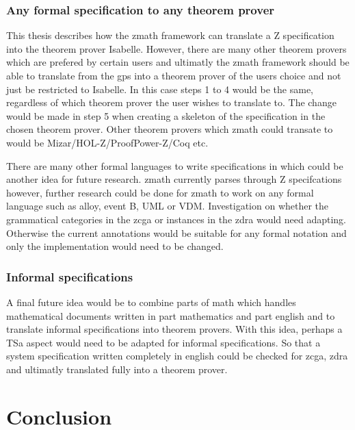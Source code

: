 \subsubsection{Any formal specification to any theorem prover}
\label{subsubsec:anyformanythe}

This thesis describes how the \gls{zmath} framework can translate a Z specification into the theorem prover Isabelle. However, there are many other theorem provers which are prefered by certain users and ultimatly the \gls{zmath} framework should be able to translate from the \gls{gps} into a theorem prover of the users choice and not just be restricted to Isabelle. In this case steps 1 to 4 would be the same, regardless of which theorem prover the user wishes to translate to. The change would be made in step 5 when creating a skeleton of the specification in the chosen theorem prover. Other theorem provers which \gls{zmath} could transate to would be Mizar/HOL-Z/ProofPower-Z/Coq etc.

There are many other formal languages to write specifications in which could be another idea for future research. \Gls{zmath} currently parses through Z specifcations however, further research could be done for \gls{zmath} to work on any formal language such as alloy, event B, UML or VDM. Investigation on whether the grammatical categories in the \gls{zcga} or instances in the \gls{zdra} would need adapting. Otherwise the current annotations would be suitable for any formal notation and only the implementation would need to be changed.

\subsubsection{Informal specifications}
\label{subsubsec:informalspecs}

A final future idea would be to combine parts of \gls{math} which handles mathematical documents written in part mathematics and part english and to translate informal specifications into theorem provers. With this idea, perhaps a TSa aspect would need to be adapted for informal specifications. So that a system specification written completely in english could be checked for \gls{zcga}, \gls{zdra} and ultimatly translated fully into a theorem prover.

\section{Conclusion}
\label{sec:conclusion}

